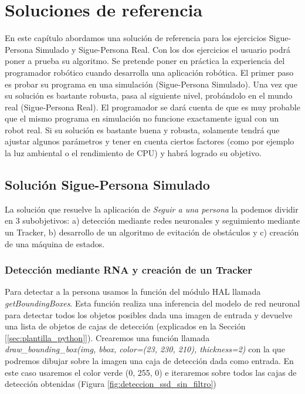 \chapter{Soluciones de referencia}
\label{cap:capitulo6}

En este capítulo abordamos una solución de referencia para los ejercicios Sigue-Persona Simulado y Sigue-Persona Real. Con los dos ejercicios el usuario podrá poner a prueba su algoritmo. Se pretende poner en práctica la experiencia del programador robótico cuando desarrolla una aplicación robótica. El primer paso es probar su programa en una simulación (Sigue-Persona Simulado). Una vez que su solución es bastante robusta, pasa al siguiente nivel, probándolo en el mundo real (Sigue-Persona Real). El programador se dará cuenta de que es muy probable que el mismo programa en simulación no funcione exactamente igual con un robot real. Si su solución es bastante buena y robusta, solamente tendrá que ajustar algunos parámetros y tener en cuenta ciertos factores (como por ejemplo la luz ambiental o el rendimiento de CPU) y habrá logrado su objetivo.\\

\section{Solución Sigue-Persona Simulado}
\label{sec:solucion_sigue_personas_simulado}

La solución que resuelve la aplicación de \textit{Seguir a una persona} la podemos dividir en 3 subobjetivos: a) detección mediante redes neuronales y seguimiento mediante un Tracker, b) desarrollo de un algoritmo de evitación de obstáculos y c) creación de una máquina de estados.\\



\subsection{Detección mediante RNA y creación de un Tracker}
\label{subsec:ml_tracker}
Para detectar a la persona usamos la función del módulo HAL llamada \textit{getBoundingBoxes}. Esta función realiza una inferencia del modelo de red neuronal para detectar todos los objetos posibles dada una imagen de entrada y devuelve una lista de objetos de cajas de detección (explicados en la Sección [\ref{sec:plantilla_python}]). Crearemos una función llamada \textit{draw\_bounding\_box(img, bbox, color=(23, 230, 210), thickness=2)} con la que podremos dibujar sobre la imagen una caja de detección dada como entrada. En este caso usaremos el color verde (0, 255, 0) e iteraremos sobre todos las cajas de detección obtenidas (Figura \ref{fig:deteccion_ssd_sin_filtro})\\

